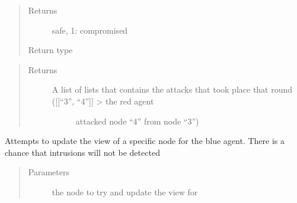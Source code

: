 \documentclass[letterpaper,10pt,english]{sphinxmanual}
\begin{document}
\begin{fulllineitems}
\begin{fulllineitems}
\begin{quote}
\begin{description}
\item[{Returns}] \leavevmode
\sphinxAtStartPar
safe, 1: compromised

\item[{Return type}] \leavevmode
{}

\end{description}\end{quote}

\end{fulllineitems}


\begin{fulllineitems}
\label{\detokenize{source/yawning_titan.envs.generic.core:yawning_titan.envs.generic.core.network_interface.NetworkInterface.get_true_attacks}}\begin{quote}\begin{description}
\item[{Returns}] \leavevmode
\sphinxAtStartPar
\begin{description}
\item[{A list of lists that contains the attacks that took place that round ({[}{[}“3”, “4”{]}{]} \sphinxhyphen{}\textgreater{} the red agent}] \leavevmode
\sphinxAtStartPar
attacked node “4” from node “3”)

\end{description}


\end{description}\end{quote}

\end{fulllineitems}


\begin{fulllineitems}
\label{\detokenize{source/yawning_titan.envs.generic.core:yawning_titan.envs.generic.core.network_interface.NetworkInterface.immediate_attempt_view_update}}
\sphinxAtStartPar
Attempts to update the view of a specific node for the blue agent. There is a chance that intrusions will not
be detected
\begin{quote}\begin{description}
\item[{Parameters}] \leavevmode
\sphinxAtStartPar
{} \textendash{} the node to try and update the view for


\end{description}
\end{quote}
\end{fulllineitems}
\end{fulllineitems}
\end{document}
